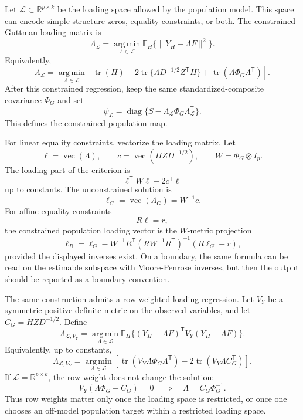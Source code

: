\documentclass[11pt]{article}
\newcommand{\T}{^{\mathsf T}}
\newcommand{\E}{\mathbb{E}}
\newcommand{\tr}{\operatorname{tr}}
\newcommand{\diag}{\operatorname{diag}}
\newcommand{\argmin}{\operatorname*{arg\,min}}
\theoremstyle{plain}
\theoremstyle{remark}
\begin{document}
Let \(\mathcal L\subset\mathbb R^{p\times k}\) be the loading space allowed by
the population model. This space can encode simple-structure zeros, equality
constraints, or both. The constrained Guttman loading matrix is
\begin{equation}\label{eq:constrained-loading-space}
  \Lambda_{\mathcal L}
  =
  \argmin_{\Lambda\in\mathcal L}
  \E_H\{\lVert Y_H-\Lambda F\rVert^2\}.
\end{equation}
Equivalently,
\[
  \Lambda_{\mathcal L}
  =
  \argmin_{\Lambda\in\mathcal L}
  \left[
    \tr(H)-2\tr\{\Lambda D^{-1/2}Z\T H\}
    +\tr(\Lambda\Phi_G\Lambda\T)
  \right].
\]
After this constrained regression, keep the same standardized-composite
covariance \(\Phi_G\) and set
\[
  \psi_{\mathcal L}
  =
  \diag\{S-\Lambda_{\mathcal L}\Phi_G\Lambda_{\mathcal L}\T\}.
\]
This defines the constrained population map.

For linear equality constraints, vectorize the loading matrix. Let
\[
  \ell=\operatorname{vec}(\Lambda),
  \qquad
  c=\operatorname{vec}(HZD^{-1/2}),
  \qquad
  W=\Phi_G\otimes I_p .
\]
The loading part of the criterion is
\[
  \ell\T W\ell-2c\T\ell
\]
up to constants. The unconstrained solution is
\[
  \ell_G=\operatorname{vec}(\Lambda_G)=W^{-1}c .
\]
For affine equality constraints
\[
  R\ell=r,
\]
the constrained population loading vector is the \(W\)-metric projection
\begin{equation}\label{eq:linear-loading-projection}
  \ell_R
  =
  \ell_G
  -
  W^{-1}R\T(RW^{-1}R\T)^{-1}(R\ell_G-r),
\end{equation}
provided the displayed inverses exist. On a boundary, the same formula can be
read on the estimable subspace with Moore-Penrose inverses, but then the output
should be reported as a boundary convention.

The same construction admits a row-weighted loading regression. Let
\(V_Y\) be a symmetric positive definite metric on the observed variables, and
let \(C_G=HZD^{-1/2}\). Define
\begin{equation}\label{eq:weighted-loading-space}
  \Lambda_{\mathcal L,V_Y}
  =
  \argmin_{\Lambda\in\mathcal L}
  \E_H\{(Y_H-\Lambda F)\T V_Y(Y_H-\Lambda F)\}.
\end{equation}
Equivalently, up to constants,
\[
  \Lambda_{\mathcal L,V_Y}
  =
  \argmin_{\Lambda\in\mathcal L}
  \left[
    \tr(V_Y\Lambda\Phi_G\Lambda\T)
    -2\tr(V_Y\Lambda C_G\T)
  \right].
\]
If \(\mathcal L=\mathbb R^{p\times k}\), the row weight does not change the
solution:
\[
  V_Y(\Lambda\Phi_G-C_G)=0
  \quad\Rightarrow\quad
  \Lambda=C_G\Phi_G^{-1}.
\]
Thus row weights matter only once the loading space is restricted, or once one
chooses an off-model population target within a restricted loading space.
\end{document}
